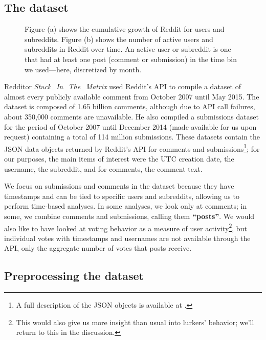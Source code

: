 \documentclass[10pt, oneside, onecolumn]{article}
\begin{document}
\subsection{The dataset}

\begin{figure}[!tb]
\centering
{}
\caption{Figure (a) shows the cumulative growth of Reddit for users and subreddits. Figure (b) shows the number of active users and subreddits in Reddit over time. An active user or subreddit is one that had at least one post (comment or submission) in the time bin we used---here, discretized by month.}
\label{fig:cumulative}
\end{figure}

Redditor \textit{Stuck\_In\_The\_Matrix} used Reddit's API to compile a dataset of almost every publicly available comment\cite{RedditDataset1} from October 2007 until May 2015.  The dataset is composed of 1.65 billion comments, although due to API call failures, about 350,000 comments are unavailable.  He also compiled a submissions dataset for the period of October 2007 until December 2014 (made available for us upon request) containing a total of 114 million submissions.  These datasets contain the JSON data objects returned by Reddit's API for comments and submissions\footnote{A full description of the JSON objects is available at \cite{RedditAPI}.}; for our purposes, the main items of interest were the UTC creation date, the username, the subreddit, and for comments, the comment text.

We focus on submissions and comments in the dataset because they have timestamps and can be tied to specific users and subreddits, allowing us to perform time-based analyses.   In some analyses, we look only at comments; in some, we combine comments and submissions, calling them \textbf{``posts''}.  We would also like to have looked at voting behavior as a measure of user activity\footnote{This would also give us more insight than usual into lurkers' behavior; we'll return to this in the discussion.}, but individual votes with timestamps and usernames are not available through the API, only the aggregate number of votes that posts receive.

\subsection{Preprocessing the dataset}
\end{document}
